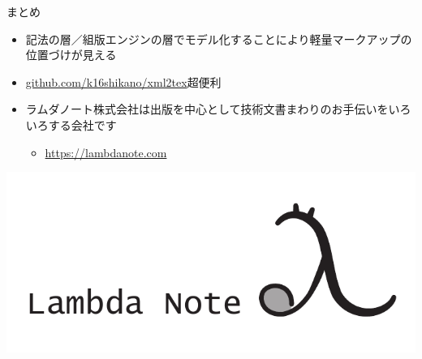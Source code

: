 \documentclass[14pt,dvipdfmx,uplatex]{beamer}
\begin{document}
\begin{frame}[t]{\inhibitglue まとめ}
  \sffamily
  \begin{itemize}
    \item 記法の層／組版エンジンの層でモデル化することにより軽量マークアップの位置づけが見える
    \item \href{https://github.com/k16shikano/xml2tex}{github.com/k16shikano/xml2tex}超便利
    \item ラムダノート株式会社は出版を中心として技術文書まわりのお手伝いをいろいろする会社です
    \begin{itemize}
      \item \url{https://lambdanote.com}
    \end{itemize}
  \end{itemize}
  \begin{center}
    \includegraphics[width=.5\textwidth]{figures/main-logo.pdf}
  \end{center}
\end{frame}
\end{document}
